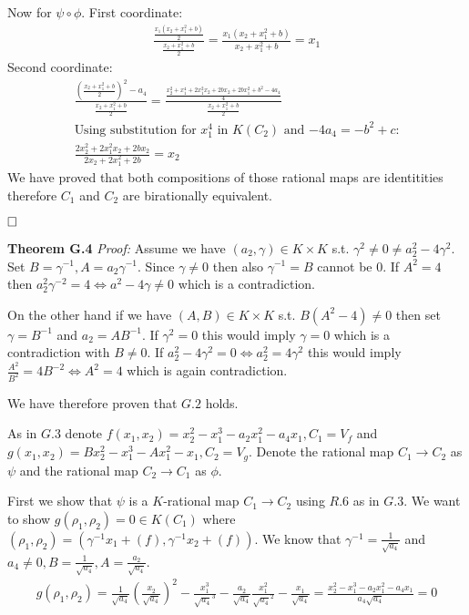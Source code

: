 \documentclass[12pt, a4paper]{article}
\newcommand{\qed}{\hfill\square}
\begin{document}
Now for $\psi \circ \phi$. First coordinate:
\begin{gather*}
\frac{\frac{x_1(x_2+x_1^2+b)}{2}}{\frac{x_2+x_1^2+b}{2}} = \frac{x_1(x_2+x_1^2+b)}{x_2+x_1^2+b} = x_1
\end{gather*}
Second coordinate:
\begin{gather*}
\frac{\left(\frac{x_2+x_1^2+b}{2}\right)^2 - a_4}{\frac{x_2+x_1^2+b}{2}} = \frac{\frac{x_2^2+x_1^4+2x_1^2x_2+2bx_2+2bx_1^2+b^2-4a_4}{4}}{\frac{x_2+x_1^2+b}{2}}\\
\text{Using substitution for $x_1^4$ in $K(C_2)$ and $-4a_4 = -b^2+c$:}\\
\frac{2x_2^2+2x_1^2x_2+2bx_2}{2x_2+2x_1^2+2b} = x_2
\end{gather*}
We have proved that both compositions of those rational maps are identitities therefore $C_1$ and $C_2$ are birationally equivalent.

$\qed$

\textbf{Theorem G.4} \textit{Proof:}
Assume we have $(a_2, \gamma) \in K \times K$ s.t. $\gamma^2 \neq 0 \neq a_2^2-4\gamma^2$. Set $B = \gamma^{-1}, A = a_2\gamma^{-1}$. Since $\gamma \neq 0$ then also $\gamma^{-1} = B$ cannot be 
0. If $A^2 = 4$ then $a_2^2\gamma^{-2} = 4 \iff a^2 - 4\gamma \neq 0$ which is a contradiction.

On the other hand if we have $(A,B) \in K \times K$ s.t. $B(A^2-4)\neq 0$ then set $\gamma = B^{-1}$ and $a_2 = AB^{-1}$. If $\gamma^2 = 0$ this would imply $\gamma = 0$ which is a contradiction with $B \neq 0$. If $a_2^2-4\gamma^2 =0 \iff a_2^2 = 4\gamma^2$ this would imply $\frac{A^2}{B^2} = 4B^{-2} \iff A^2 = 4$ which is again contradiction.

We have therefore proven that $G.2$ holds.

As in $G.3$ denote $f(x_1,x_2) = x_2^2-x_1^3-a_2x_1^2-a_4x_1, C_1 = V_f$ and $g(x_1,x_2) = Bx_2^2-x_1^3-Ax_1^2-x_1, C_2 = V_g$. Denote the rational map $C_1 \rightarrow C_2$ as $\psi$ and the rational map $C_2 \rightarrow C_1$ as $\phi$.

First we show that $\psi$ is a $K$-rational map $C_1 \rightarrow C_2$ using $R.6$ as in $G.3$. We want to show $g(\rho_1, \rho_2) = 0 \in K(C_1)$ where $(\rho_1, \rho_2) = \left(\gamma^{-1}x_1 + (f), \gamma^{-1}x_2 + (f) \right)$. We know that $\gamma^{-1} = \frac{1}{\sqrt{a_4}}$ and $a_4 \neq 0, B = \frac{1}{\sqrt{a_4}}, A = \frac{a_2}{\sqrt{a_4}}$.
\begin{gather*}
g(\rho_1, \rho_2) = \frac{1}{\sqrt{a_4}}\left( \frac{x_2}{\sqrt{a_4}} \right)^2 - \frac{x_1^3}{\sqrt{a_4}^3} - \frac{a_2}{\sqrt{a_4}}\frac{x_1^2}{\sqrt{a_4}^2} - \frac{x_1}{\sqrt{a_4}} = \frac{x_2^2-x_1^3-a_2x_1^2-a_4x_1}{a_4\sqrt{a_4}} = 0
\end{gather*} 
\end{document}
